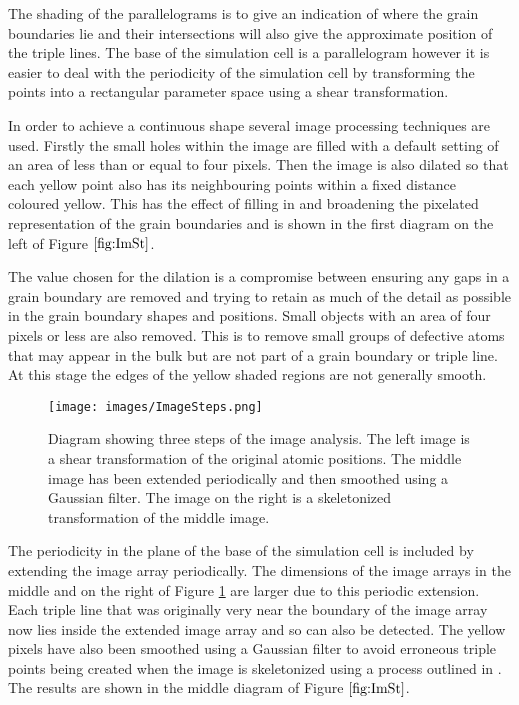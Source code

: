 \documentclass[12pt,a4paper,openany]{report}
\begin{document}
The shading of the parallelograms is to give an indication of where the grain boundaries lie and their intersections will also give the approximate position of the triple lines. The base of the simulation cell is a parallelogram however it is easier to deal with the periodicity of the simulation cell by transforming the points into a rectangular parameter space using a shear transformation. 

In order to achieve a continuous shape several image processing techniques are used. Firstly the small holes within the image are filled with a default setting of an area of less than or equal to four pixels. Then the image is also dilated so that each yellow point also has its neighbouring points within a fixed distance coloured yellow. This has the effect of filling in and broadening the pixelated representation of the grain boundaries and is shown in the first diagram on the left of Figure $\ref{fig:ImSt}$. 

The value chosen for the dilation is a compromise between ensuring any gaps in a grain boundary are removed and trying to retain as much of the detail as possible in the grain boundary shapes and positions. Small objects with an area of four pixels or less are also removed. This is to remove small groups of defective atoms that may appear in the bulk but are not part of a grain boundary or triple line. At this stage the edges of the yellow shaded regions are not generally smooth.

 
\begin{figure}[H]
	\centering
	\texttt{[image: images/ImageSteps.png]} 
	\caption{Diagram showing three steps of the image analysis. The left image is a shear transformation of the original atomic positions. The middle image has been extended periodically and then smoothed using a Gaussian filter. The image on the right is a skeletonized transformation of the middle image.}  
	\label{fig:ImSt}
\end{figure}


The periodicity in the plane of the base of the simulation cell is included by extending the image array periodically. The dimensions of the image arrays in the middle and on the right of Figure \ref{fig:ImSt} are larger due to this periodic extension. Each triple line that was originally very near the boundary of the image array now lies inside the extended image array and so can also be detected. The yellow pixels have also been smoothed using a Gaussian filter to avoid erroneous triple points being created when the image is skeletonized using a process outlined in \cite{ZHANG1997,Abu-Ain2013}. The results are shown in the middle diagram of Figure $\ref{fig:ImSt}$.  
\end{document}
